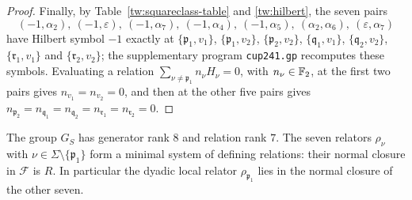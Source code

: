\begin{proof}
Finally, by Table~\ref{tw:squareclass-table} and \eqref{tw:hilbert}, the
seven pairs
\[
 (-1,\alpha_2),\ (-1,\varepsilon),\ (-1,\alpha_7),\ (-1,\alpha_4),\
 (-1,\alpha_5),\ (\alpha_2,\alpha_6),\ (\varepsilon,\alpha_7)
\]
have Hilbert symbol $-1$ exactly at $\{\mathfrak p_1,v_1\}$,
$\{\mathfrak p_1,v_2\}$, $\{\mathfrak p_2,v_2\}$, $\{\mathfrak q_1,v_1\}$,
$\{\mathfrak q_2,v_2\}$, $\{\mathfrak r_1,v_1\}$ and $\{\mathfrak r_2,v_2\}$;
the supplementary program \texttt{cup241.gp} recomputes these symbols.
Evaluating a relation $\sum_{\nu\ne\mathfrak p_1}n_\nu H_\nu=0$, with
$n_\nu\in\mathbb F_2$, at the first two pairs gives $n_{v_1}=n_{v_2}=0$, and then
at the other five pairs gives
$n_{\mathfrak p_2}=n_{\mathfrak q_1}=n_{\mathfrak q_2}=n_{\mathfrak r_1}=n_{\mathfrak r_2}=0$.
\end{proof}

\begin{lemma}\label{tw:complete-global-presentation}
The group $G_S$ has generator rank $8$ and relation rank $7$. The
seven relators $\rho_\nu$ with $\nu\in\Sigma\setminus\{\mathfrak p_1\}$ form
a minimal system of defining relations: their normal closure in
$\mathcal F$ is $R$. In particular the dyadic local relator
$\rho_{\mathfrak p_1}$ lies in the normal closure of the other seven.
\end{lemma}


